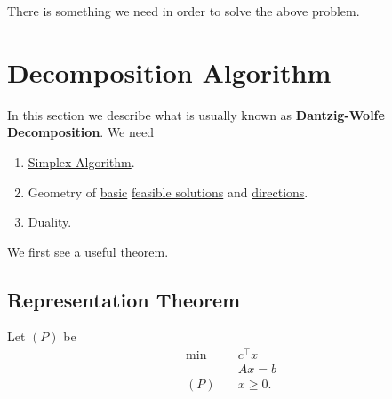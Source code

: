 There is something we need in order to solve the above problem.

\section{Decomposition Algorithm}
In this section we describe what is usually known as \textbf{Dantzig-Wolfe Decomposition}. We need
\begin{enumerate}
	\item \hyperref[algo:simplex-algorithm]{Simplex Algorithm}.
	\item Geometry of \hyperref[def:basic-solution]{basic} \hyperref[def:feasible-solution]{feasible solutions} and \hyperref[def:basic-direction]{directions}.
	\item Duality.
\end{enumerate}

We first see a useful theorem.
\subsection{Representation Theorem}
Let \((P)\) be
\[
	\begin{aligned}
		\min~    & c^{\top}x \\
		         & Ax = b    \\
		(P)\quad & x\geq 0.
	\end{aligned}
\]

